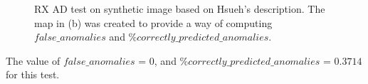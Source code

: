 \begin{figure}[H]
\begin{minipage}[]{.5\linewidth}
\end{minipage}


\caption{RX AD test on synthetic image based on Hsueh's description. The map in (b) was created to provide a way of computing $false\_anomalies$ and $ \%correctly\_predicted\_anomalies$.  }
\label{fig:hsueh_image_RX_test}
\end{figure}

The value of $false\_anomalies$ = 0, and  $\%correctly\_predicted\_anomalies$ = $0.3714$ for this test.

